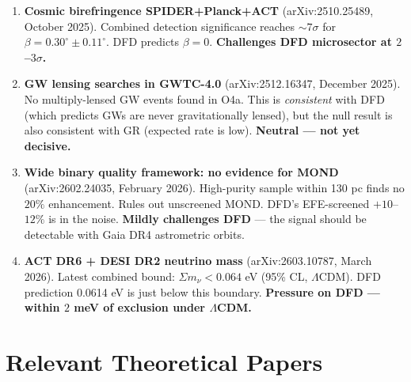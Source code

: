 \documentclass[11pt,a4paper]{article}
\begin{document}
\begin{enumerate}[resume]
\item \textbf{Cosmic birefringence SPIDER+Planck+ACT} (arXiv:2510.25489, October 2025). Combined detection significance reaches $\sim 7\sigma$ for $\beta = 0.30^\circ \pm 0.11^\circ$. DFD predicts $\beta = 0$. \textbf{Challenges DFD microsector at $2$--$3\sigma$.}

\item \textbf{GW lensing searches in GWTC-4.0} (arXiv:2512.16347, December 2025). No multiply-lensed GW events found in O4a. This is \emph{consistent} with DFD (which predicts GWs are never gravitationally lensed), but the null result is also consistent with GR (expected rate is low). \textbf{Neutral --- not yet decisive.}

\item \textbf{Wide binary quality framework: no evidence for MOND} (arXiv:2602.24035, February 2026). High-purity sample within 130 pc finds no $20\%$ enhancement. Rules out unscreened MOND. DFD's EFE-screened $+10$--$12\%$ is in the noise. \textbf{Mildly challenges DFD} --- the signal should be detectable with Gaia DR4 astrometric orbits.

\item \textbf{ACT DR6 + DESI DR2 neutrino mass} (arXiv:2603.10787, March 2026). Latest combined bound: $\Sigma m_\nu < 0.064$ eV (95\% CL, $\Lambda$CDM). DFD prediction 0.0614 eV is just below this boundary. \textbf{Pressure on DFD --- within $2$ meV of exclusion under $\Lambda$CDM.}
\end{enumerate}

\section{Relevant Theoretical Papers}
\end{document}
